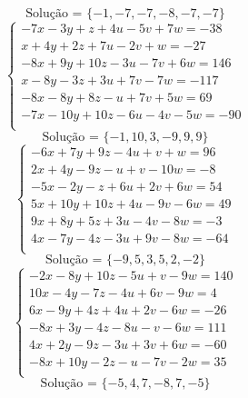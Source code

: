 \documentclass[12pt,oneside,a4paper]{article}
\begin{document}
\begin{equation*}
\text{Solução = }\{-1,-7,-7,-8,-7,-7\}
\end{equation*}
\vspace{\baselineskip}
\begin{equation*}
\begin{cases}
-7x-3y+z+4u-5v+7w=-38 \\
x+4y+2z+7u-2v+w=-27 \\
-8x+9y+10z-3u-7v+6w=146 \\
x-8y-3z+3u+7v-7w=-117 \\
-8x-8y+8z-u+7v+5w=69 \\
-7x-10y+10z-6u-4v-5w=-90 \\
\end{cases}
\end{equation*}
\begin{equation*}
\text{Solução = }\{-1,10,3,-9,9,9\}
\end{equation*}
\vspace{\baselineskip}
\begin{equation*}
\begin{cases}
-6x+7y+9z-4u+v+w=96 \\
2x+4y-9z-u+v-10w=-8 \\
-5x-2y-z+6u+2v+6w=54 \\
5x+10y+10z+4u-9v-6w=49 \\
9x+8y+5z+3u-4v-8w=-3 \\
4x-7y-4z-3u+9v-8w=-64 \\
\end{cases}
\end{equation*}
\begin{equation*}
\text{Solução = }\{-9,5,3,5,2,-2\}
\end{equation*}
\vspace{\baselineskip}
\begin{equation*}
\begin{cases}
-2x-8y+10z-5u+v-9w=140 \\
10x-4y-7z-4u+6v-9w=4 \\
6x-9y+4z+4u+2v-6w=-26 \\
-8x+3y-4z-8u-v-6w=111 \\
4x+2y-9z-3u+3v+6w=-60 \\
-8x+10y-2z-u-7v-2w=35 \\
\end{cases}
\end{equation*}
\begin{equation*}
\text{Solução = }\{-5,4,7,-8,7,-5\}
\end{equation*}
\end{document}
